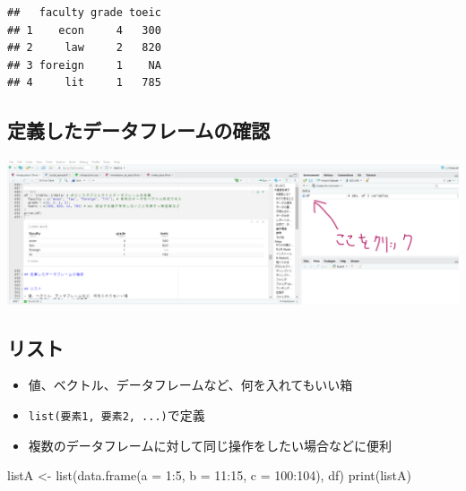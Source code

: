 \documentclass[
]{ltjsarticle}
\newenvironment{Shaded}{\begin{snugshade}}{\end{snugshade}}
\newcommand{\AttributeTok}[1]{\textcolor[rgb]{0.77,0.63,0.00}{#1}}
\newcommand{\DecValTok}[1]{\textcolor[rgb]{0.00,0.00,0.81}{#1}}
\newcommand{\FunctionTok}[1]{\textcolor[rgb]{0.00,0.00,0.00}{#1}}
\newcommand{\NormalTok}[1]{#1}
\newcommand{\OtherTok}[1]{\textcolor[rgb]{0.56,0.35,0.01}{#1}}
\newcommand{\SpecialCharTok}[1]{\textcolor[rgb]{0.00,0.00,0.00}{#1}}
\providecommand{\tightlist}{%
  \setlength{\itemsep}{0pt}\setlength{\parskip}{0pt}}
\begin{document}
\begin{verbatim}
##   faculty grade toeic
## 1    econ     4   300
## 2     law     2   820
## 3 foreign     1    NA
## 4     lit     1   785
\end{verbatim}

\hypertarget{ux5b9aux7fa9ux3057ux305fux30c7ux30fcux30bfux30d5ux30ecux30fcux30e0ux306eux78baux8a8d}{%
\subsection{定義したデータフレームの確認}\label{ux5b9aux7fa9ux3057ux305fux30c7ux30fcux30bfux30d5ux30ecux30fcux30e0ux306eux78baux8a8d}}

\begin{center}\includegraphics[width=0.9\linewidth]{figs/df_check} \end{center}

\hypertarget{ux30eaux30b9ux30c8}{%
\subsection{リスト}\label{ux30eaux30b9ux30c8}}

\begin{itemize}
\tightlist
\item
  値、ベクトル、データフレームなど、何を入れてもいい箱
\item
  \texttt{list(要素1,\ 要素2,\ ...)}で定義
\item
  複数のデータフレームに対して同じ操作をしたい場合などに便利
\end{itemize}

\begin{Shaded}
\begin{Highlighting}[]
\NormalTok{listA }\OtherTok{\textless{}{-}} \FunctionTok{list}\NormalTok{(}\FunctionTok{data.frame}\NormalTok{(}\AttributeTok{a =} \DecValTok{1}\SpecialCharTok{:}\DecValTok{5}\NormalTok{, }\AttributeTok{b =} \DecValTok{11}\SpecialCharTok{:}\DecValTok{15}\NormalTok{, }\AttributeTok{c =} \DecValTok{100}\SpecialCharTok{:}\DecValTok{104}\NormalTok{), df)}
\FunctionTok{print}\NormalTok{(listA)}
\end{Highlighting}
\end{Shaded}
\end{document}

